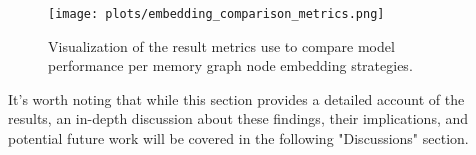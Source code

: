 \begin{figure}[H]\label{results:compare:embeddings:full}
    \centering
    \texttt{[image: plots/embedding\_comparison\_metrics.png]}
    \caption{Visualization of the result metrics use to compare model performance per memory graph node embedding strategies.}
\end{figure}

It's worth noting that while this section provides a detailed account of the results, an in-depth discussion about these findings, their implications, and potential future work will be covered in the following "Discussions" section.
